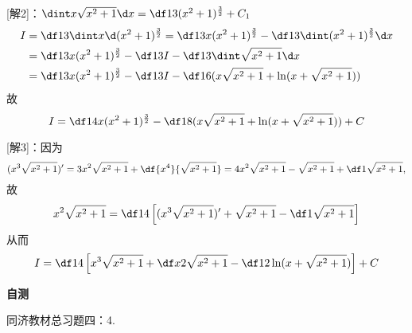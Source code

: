 [解2]：$\dint x\sqrt{x^2+1}\d x=\df13(x^2+1)^{\frac32}+C_1$
\begin{align}
I&=\df13\dint x\d(x^2+1)^{\frac32}=\df13 x(x^2+1)^{\frac32}
-\df13\dint(x^2+1)^{\frac32}\d x\notag\\
&=\df13x(x^2+1)^{\frac32}-\df13I-\df13\dint\sqrt{x^2+1}\d x\notag\\
&=\df13x(x^2+1)^{\frac32}-\df13I-\df16(x\sqrt{x^2+1}
+\ln(x+\sqrt{x^2+1}))\notag
\end{align}
故
$$I=\df14x(x^2+1)^{\frac32}-\df18(x\sqrt{x^2+1}
+\ln(x+\sqrt{x^2+1}))+C$$

[解3]：因为
$$(x^3\sqrt{x^2+1})'=3x^2\sqrt{x^2+1}+\df{x^4}{\sqrt{x^2+1}}
=4x^2\sqrt{x^2+1}-\sqrt{x^2+1}+\df1{\sqrt{x^2+1}},$$
故
$$x^2\sqrt{x^2+1}=\df14\left[(x^3\sqrt{x^2+1})'+\sqrt{x^2+1}
-\df1{\sqrt{x^2+1}}\right]$$
从而
$$I=\df14\left[x^3\sqrt{x^2+1}+\df x2\sqrt{x^2+1}
-\df12\ln(x+\sqrt{x^2+1})\right]+C$$

\begin{ext}
	{\bf 自测}

	同济教材总习题四：4.
\end{ext}